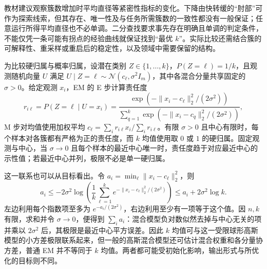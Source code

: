 教材建议观察簇数增加时平均直径等紧密性指标的变化。下降由快转缓的“肘部”可作为探索线索，但其存在、唯一性及与任务所需簇数的一致性都没有一般保证；任意运行所得平均直径也不必单调。二分查找要求事先存在明确且单调的判定条件，不能仅凭一条可能有拐点的经验曲线就保证找到“最优 $k$”。实际比较还需结合簇的可解释性、重采样或重启后的稳定性，以及领域中需要保留的结构。

\begin{remark}
\label{rem:lh-kmeans-gmm}
为比较硬归属与概率归属，设潜在类别 $Z\in\{1,\ldots,k\}$，$P(Z=\ell)=1/k$，且观测随机向量 $U$ 满足 $U\mid Z=\ell\sim\mathcal N(c_\ell,\sigma^2I_m)$，其中各混合分量共享固定的 $\sigma>0$。给定观测 $x_i$，EM 的 E 步计算责任度
\begin{equation}
r_{i\ell}=P(Z=\ell\mid U=x_i)
=\frac{\exp(-\|x_i-c_\ell\|_2^2/(2\sigma^2))}
{\sum_{q=1}^k\exp(-\|x_i-c_q\|_2^2/(2\sigma^2))},
\label{eq:lh-kmeans-gmm-responsibility}
\end{equation}
M 步对均值使用加权平均 $c_\ell=\sum_i r_{i\ell}x_i/\sum_i r_{i\ell}$。有限 $\sigma>0$ 且中心有限时，每个样本对各簇都有严格为正的责任度，而 $k$ 均值使用取 $0$ 或 $1$ 的硬归属。固定观测与中心，当 $\sigma\to0$ 且每个样本的最近中心唯一时，责任度趋于对应最近中心的示性值；若最近中心并列，极限不必是单一硬归属。

这一联系也可以从目标看出。令 $a_i=\min_\ell\|x_i-c_\ell\|_2^2$，则
\[
a_i\leq-2\sigma^2\log\left(\frac1k\sum_{\ell=1}^k
e^{-\|x_i-c_\ell\|_2^2/(2\sigma^2)}\right)
\leq a_i+2\sigma^2\log k.
\]
左边利用每个指数项至多为 $e^{-a_i/(2\sigma^2)}$，右边利用至少有一项等于这个值。因 $n,k$ 有限，求和并令 $\sigma\to0$，便得到 $\sum_i a_i$：混合模型负对数似然去掉与中心无关的项并乘以 $2\sigma^2$ 后，其极限是最近中心平方误差。因此 $k$ 均值可与这一受限球形高斯模型的小方差极限联系起来，但一般的高斯混合模型还可估计混合权重和各分量协方差，普通 EM 并不等同于 $k$ 均值。两者都可能受初始化影响，输出形式与所优化的目标则不同。
\end{remark}






